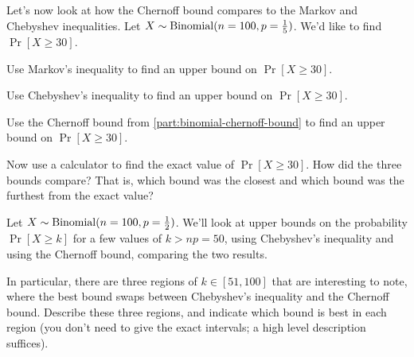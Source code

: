 \documentclass[11pt]{article}
\begin{document}
\begin{Parts}
    \item Let's now look at how the Chernoff bound compares to the Markov and 
    Chebyshev inequalities. Let $X \sim \operatorname{Binomial}(n = 100, p = \frac{1}{5})$. We'd 
    like to find $\Pr[X \ge 30]$.

        \begin{Parts}
            \item Use Markov's inequality to find an upper bound on $\Pr[X \ge 
            30]$.

            \item Use Chebyshev's inequality to find an upper bound on $\Pr[X 
            \ge 30]$.

            \item Use the Chernoff bound from \cref{part:binomial-chernoff-bound} 
            to find an upper bound on $\Pr[X \ge 30]$.

            \item Now use a calculator to find the exact value of $\Pr[X \ge 
            30]$. How did the three bounds compare? That is, which bound was the 
            closest and which bound was the furthest from the exact value?
        \end{Parts}

    \item Let $X \sim \operatorname{Binomial}(n = 100, p =\frac{1}{2})$. We'll look at upper bounds 
    on the probability $\Pr[X \ge k]$ for a few values of $k > np = 50$, using 
    Chebyshev's inequality and using the Chernoff bound, comparing the two 
    results.

    In particular, there are three regions of $k \in [51, 100]$ that are 
    interesting to note, where the best bound swaps between Chebyshev's 
    inequality and the Chernoff bound. Describe these three regions, and 
    indicate which bound is best in each region (you don't need to give the 
    exact intervals; a high level description suffices).
\end{Parts}
\end{document}
